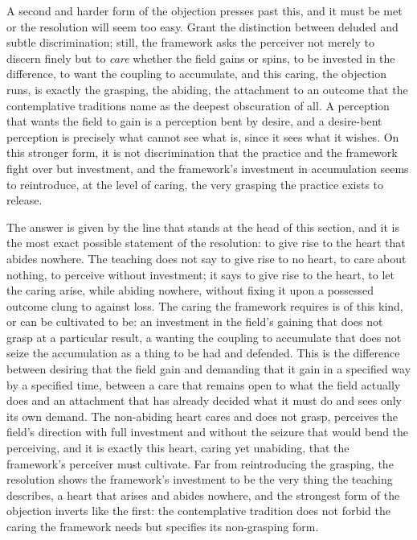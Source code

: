 A second and harder form of the objection presses past this, and it must be met or the resolution will seem too easy. Grant the distinction between deluded and subtle discrimination; still, the framework asks the perceiver not merely to discern finely but to \emph{care} whether the field gains or spins, to be invested in the difference, to want the coupling to accumulate, and this caring, the objection runs, is exactly the grasping, the abiding, the attachment to an outcome that the contemplative traditions name as the deepest obscuration of all. A perception that wants the field to gain is a perception bent by desire, and a desire-bent perception is precisely what cannot see what is, since it sees what it wishes. On this stronger form, it is not discrimination that the practice and the framework fight over but investment, and the framework's investment in accumulation seems to reintroduce, at the level of caring, the very grasping the practice exists to release.

The answer is given by the line that stands at the head of this section, and it is the most exact possible statement of the resolution: to give rise to the heart that abides nowhere. The teaching does not say to give rise to no heart, to care about nothing, to perceive without investment; it says to give rise to the heart, to let the caring arise, while abiding nowhere, without fixing it upon a possessed outcome clung to against loss. The caring the framework requires is of this kind, or can be cultivated to be: an investment in the field's gaining that does not grasp at a particular result, a wanting the coupling to accumulate that does not seize the accumulation as a thing to be had and defended. This is the difference between desiring that the field gain and demanding that it gain in a specified way by a specified time, between a care that remains open to what the field actually does and an attachment that has already decided what it must do and sees only its own demand. The non-abiding heart cares and does not grasp, perceives the field's direction with full investment and without the seizure that would bend the perceiving, and it is exactly this heart, caring yet unabiding, that the framework's perceiver must cultivate. Far from reintroducing the grasping, the resolution shows the framework's investment to be the very thing the teaching describes, a heart that arises and abides nowhere, and the strongest form of the objection inverts like the first: the contemplative tradition does not forbid the caring the framework needs but specifies its non-grasping form.

